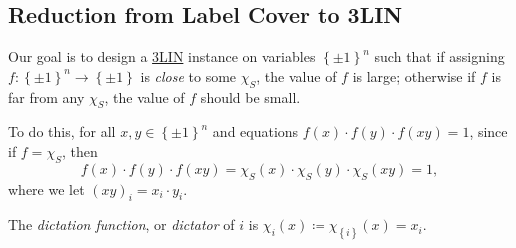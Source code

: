 \subsection{Reduction from Label Cover to 3LIN}
Our goal is to design a \hyperref[prb:3LIN]{3LIN} instance on variables \(\left\{ \pm 1 \right\} ^n\) such that if assigning \(f\colon \left\{ \pm 1 \right\} ^n \to  \left\{ \pm 1 \right\} \) is \emph{close} to some \(\chi _S\), the value of \(f\) is large; otherwise if \(f\) is far from any \(\chi _S\), the value of \(f\) should be small.

To do this, for all \(x, y\in \left\{ \pm 1 \right\} ^n\) and equations \(f(x) \cdot f(y) \cdot f(xy) = 1\), since if \(f = \chi _S\), then
\[
	f(x) \cdot f(y) \cdot f(xy) = \chi _S(x) \cdot \chi _S(y) \cdot \chi _S(xy) = 1,
\]
where we let \((xy)_i = x_i \cdot y_i\).


\begin{notation}
	The \emph{dictation function}, or \emph{dictator} of \(i\) is \(\chi _i(x) \coloneqq \chi _{\left\{ i \right\} } (x) = x_i\).
\end{notation}

